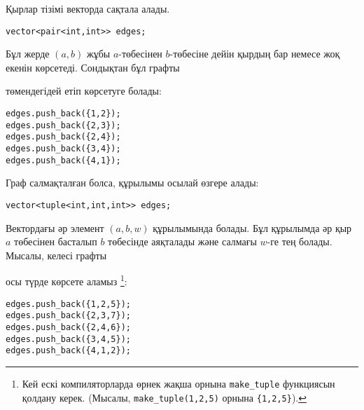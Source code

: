 Қырлар тізімі векторда сақтала алады.
\begin{lstlisting}
vector<pair<int,int>> edges;
\end{lstlisting}
Бұл жерде $(a,b)$ жұбы $a$-төбесінен $b$-төбесіне дейін қырдың бар немесе жоқ екенін көрсетеді.
Сондықтан бұл графты

\begin{center}
\end{center}
төмендегідей етіп көрсетуге болады:
\begin{lstlisting}
edges.push_back({1,2});
edges.push_back({2,3});
edges.push_back({2,4});
edges.push_back({3,4});
edges.push_back({4,1});
\end{lstlisting}

\noindent
Граф салмақталған болса, құрылымы осылай өзгере алады:
\begin{lstlisting}
vector<tuple<int,int,int>> edges;
\end{lstlisting}
Вектордағы әр элемент $(a,b,w)$ құрылымында болады. Бұл құрылымда әр қыр $a$ төбесінен басталып $b$ төбесінде аяқталады және салмағы $w$-ге тең болады.
Мысалы, келесі графты

\begin{center}
\end{center}
\begin{samepage}
осы түрде көрсете аламыз \footnote{Кей ескі компиляторларда өрнек жақша орнына \texttt{make\_tuple} функциясын қолдану керек. (Мысалы,
\texttt{make\_tuple(1,2,5)} орнына \texttt{\{1,2,5\}}).}:

\begin{lstlisting}
edges.push_back({1,2,5});
edges.push_back({2,3,7});
edges.push_back({2,4,6});
edges.push_back({3,4,5});
edges.push_back({4,1,2});
\end{lstlisting}
\end{samepage}
